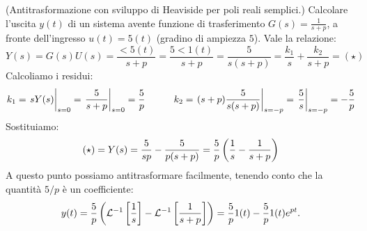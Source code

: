 \begin{esem} (Antitrasformazione con sviluppo di Heaviside per poli reali semplici.) Calcolare l'uscita $y(t)$ di un sistema avente funzione di trasferimento $G(s) = \frac{1}{s+p}$, a fronte dell'ingresso $u(t) = 5(t)$ (gradino di ampiezza $5$). Vale la relazione:
\begin{equation*}
Y(s) = G(s) U(s) =  \frac{\lt{5(t)}}{s+p} = \frac{5\lt{1(t)}}{s+p} = \frac{5}{s(s+p)} = \frac{k_1}{s} + \frac{k_2}{s+p} = (\star) 
\end{equation*}
Calcoliamo i residui:
\begin{equation*}
k_1 = \eval{sY(s)}_{s=0} = \eval{\frac{5}{s+p}}_{s=0} = \frac{5}{p} \quad \quad \quad k_2 = \eval{(s+p)\frac{5}{s(s+p)}}_{s=-p} = \eval{\frac{5}{s}}_{s=-p} = -\frac{5}{p}
\end{equation*}
Sostituiamo:
\begin{equation*}
(\star) = Y(s) = \frac{5}{sp} - \frac{5}{p(s+p)} = \frac{5}{p}\left( \frac{1}{s} - \frac{1}{s+p} \right)
\end{equation*}
A questo punto possiamo antitrasformare facilmente, tenendo conto che la quantità $5/p$ è un coefficiente:
\begin{equation*}
y(t) = \frac{5}{p}\left( \mathcal{L}^{-1}\left[ \frac{1}{s} \right] - \mathcal{L}^{-1}\left[ \frac{1}{s+p} \right] \right) = \frac{5}{p}1(t)-\frac{5}{p}1(t)e^{pt}.
\end{equation*}
\end{esem}
\newpage
